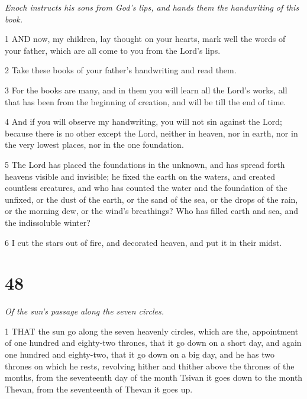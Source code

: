 \par \textit{Enoch instructs his sons from God's lips, and hands them the handwriting of this book.}

\par 1 AND now, my children, lay thought on your hearts, mark well the words of your father, which are all come to you from the Lord's lips.

\par 2 Take these books of your father's handwriting and read them.

\par 3 For the books are many, and in them you will learn all the Lord's works, all that has been from the beginning of creation, and will be till the end of time.

\par 4 And if you will observe my handwriting, you will not sin against the Lord; because there is no other except the Lord, neither in heaven, nor in earth, nor in the very lowest places, nor in the one foundation.

\par 5 The Lord has placed the foundations in the unknown, and has spread forth heavens visible and invisible; he fixed the earth on the waters, and created countless creatures, and who has counted the water and the foundation of the unfixed, or the dust of the earth, or the sand of the sea, or the drops of the rain, or the morning dew, or the wind's breathings? Who has filled earth and sea, and the indissoluble winter?

\par 6 I cut the stars out of fire, and decorated heaven, and put it in their midst.

\chapter{48}

\par \textit{Of the sun's passage along the seven circles.}

\par 1 THAT the sun go along the seven heavenly circles, which are the, appointment of one hundred and eighty-two thrones, that it go down on a short day, and again one hundred and eighty-two, that it go down on a big day, and he has two thrones on which he rests, revolving hither and thither above the thrones of the months, from the seventeenth day of the month Tsivan it goes down to the month Thevan, from the seventeenth of Thevan it goes up.

